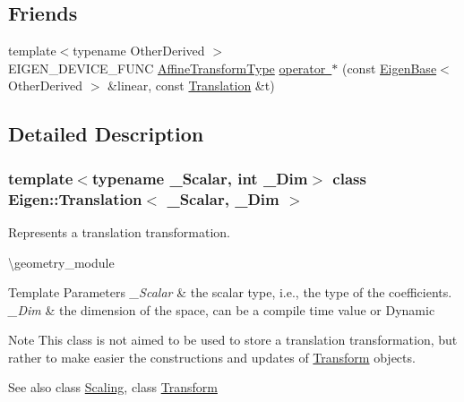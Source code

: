 \subsection*{Friends}
\begin{DoxyCompactItemize}
\item 
{\footnotesize template$<$typename Other\+Derived $>$ }\\E\+I\+G\+E\+N\+\_\+\+D\+E\+V\+I\+C\+E\+\_\+\+F\+U\+NC \mbox{\hyperlink{class_eigen_1_1_translation_a25c762409320ba9490a0d12c6652bbad}{Affine\+Transform\+Type}} \mbox{\hyperlink{class_eigen_1_1_translation_adca080f024dd6a80b880c07765c07768}{operator $\ast$}} (const \mbox{\hyperlink{struct_eigen_1_1_eigen_base}{Eigen\+Base}}$<$ Other\+Derived $>$ \&linear, const \mbox{\hyperlink{class_eigen_1_1_translation}{Translation}} \&t)
\end{DoxyCompactItemize}


\subsection{Detailed Description}
\subsubsection*{template$<$typename \+\_\+\+Scalar, int \+\_\+\+Dim$>$\newline
class Eigen\+::\+Translation$<$ \+\_\+\+Scalar, \+\_\+\+Dim $>$}

Represents a translation transformation. 

\textbackslash{}geometry\+\_\+module


\begin{DoxyTemplParams}{Template Parameters}
{\em \+\_\+\+Scalar} & the scalar type, i.\+e., the type of the coefficients. \\
\hline
{\em \+\_\+\+Dim} & the dimension of the space, can be a compile time value or Dynamic\\
\hline
\end{DoxyTemplParams}
\begin{DoxyNote}{Note}
This class is not aimed to be used to store a translation transformation, but rather to make easier the constructions and updates of \mbox{\hyperlink{class_eigen_1_1_transform}{Transform}} objects.
\end{DoxyNote}
\begin{DoxySeeAlso}{See also}
class \mbox{\hyperlink{class_scaling}{Scaling}}, class \mbox{\hyperlink{class_eigen_1_1_transform}{Transform}} 
\end{DoxySeeAlso}


